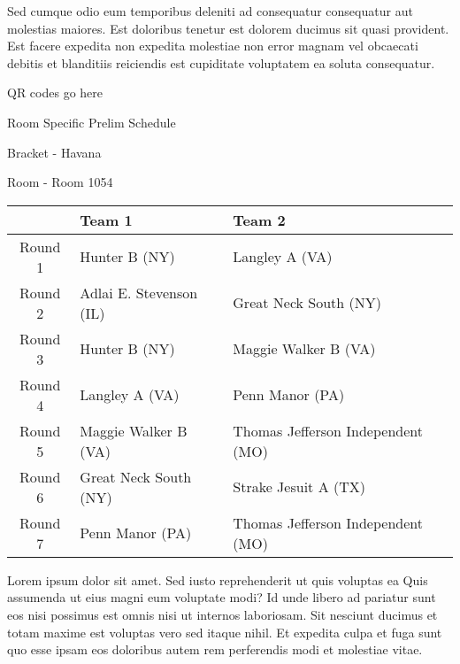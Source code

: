 \documentclass{article}%
\begin{document}
\newline%
Sed cumque odio eum temporibus deleniti ad consequatur consequatur aut molestias maiores. Est doloribus tenetur est dolorem ducimus sit quasi provident. Est facere expedita non expedita molestiae non error magnam vel obcaecati debitis et blanditiis reiciendis est cupiditate voluptatem ea soluta consequatur.%
\vspace*{140pt}%
\begin{center}%
\begin{Huge}%
QR codes go here%
\end{Huge}%
\end{center}%
\newpage%
\begin{center}%
\begin{Huge}%
Room Specific Prelim Schedule%
\end{Huge}%
\vspace*{8pt}%
\linebreak%
\begin{Large}%
Bracket {-} Havana%
\end{Large}%
\vspace*{8pt}%
\linebreak%
\vspace*{8pt}%
\begin{Large}%
Room {-} Room 1054%
\end{Large}%
\end{center}%
%
\begin{tabularx}{\textwidth}{|c|Y|Y|}%
\hline%
&Team 1&Team 2\\%
\hline%
Round 1&Hunter B (NY)&Langley A (VA)\\%
Round 2&Adlai E. Stevenson (IL)&Great Neck South (NY)\\%
Round 3&Hunter B (NY)&Maggie Walker B (VA)\\%
Round 4&Langley A (VA)&Penn Manor (PA)\\%
Round 5&Maggie Walker B (VA)&Thomas Jefferson Independent (MO)\\%
Round 6&Great Neck South (NY)&Strake Jesuit A (TX)\\%
Round 7&Penn Manor (PA)&Thomas Jefferson Independent (MO)\\%
\hline%
\end{tabularx}%
\vspace*{8pt}%
\newline%
Lorem ipsum dolor sit amet. Sed iusto reprehenderit ut quis voluptas ea Quis assumenda ut eius magni eum voluptate modi? Id unde libero ad pariatur sunt eos nisi possimus est omnis nisi ut internos laboriosam. Sit nesciunt ducimus et totam maxime est voluptas vero sed itaque nihil. Et expedita culpa et fuga sunt quo esse ipsam eos doloribus autem rem perferendis modi et molestiae vitae.\newline%
\end{document}
